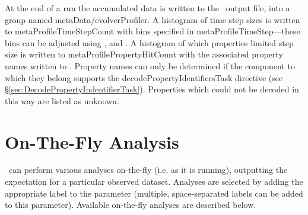 At the end of a run the accumulated data is written to the \glc\ output file, into a group named {\normalfont \ttfamily metaData/evolverProfiler}. A histogram of time step sizes is written to {\normalfont \ttfamily metaProfileTimeStepCount} with bins specified in {\normalfont \ttfamily metaProfileTimeStep}---these bins can be adjusted using {\normalfont \ttfamily [metaProfileTimeStepMinimum]}, {\normalfont \ttfamily [metaProfileTimeStepMaximum]} and {\normalfont \ttfamily [metaProfileTimeStepPointsPerDecade]}. A histogram of which properties limited step size is written to {\normalfont \ttfamily metaProfilePropertyHitCount} with the associated property names written to {\normalfont \ttfamily [metaProfilePropertyNames]}. Property names can only be determined if the component to which they belong supports the {\normalfont \ttfamily decodePropertyIdentifiersTask} directive (see \S\ref{sec:DecodePropertyIndentifierTask}). Properties which could not be decoded in this way are listed as {\normalfont \ttfamily unknown}.

\section{On-The-Fly Analysis}\label{sec:OnTheFlyAnalysis}

\glc\ can perform various analyses on-the-fly (i.e. as it is running), outputting the expectation for a particular observed dataset. Analyses are selected by adding the appropriate label to the {\normalfont \ttfamily [mergerTreeAnalyses]} parameter (multiple, space-separated labels can be added to this parameter). Available on-the-fly analyses are described below.

